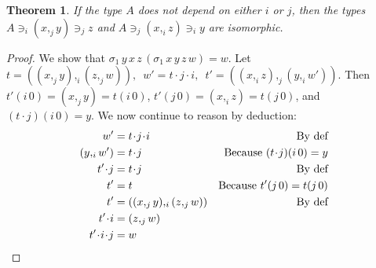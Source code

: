 \documentclass[english]{PaperTools/latex/entcs}
\theoremstyle{plain}
\newtheorem{theorem}{Theorem}
\theoremstyle{definition}
\theoremstyle{remark}
\newcommand\CP[3]{(#2,_{#1} #3)}
\newcommand\param[1]{\!\cdot\!#1}
\newcommand\op[1]{∋_{#1}}
\newcommand\mor[2]{({#1}\,{#2})}
\newcommand\proj[2]{{#2}\mor{#1}0}
\newcommand\projp[2]{\proj{#1}{(#2)}}
\def\ie{\textit{i.e.}}
\begin{document}
\begin{theorem}
  If the type $A$ does not depend on either $i$ or $j$, then
  the types $A \op i \CP j x y \op j z$ and $A \op j \CP i x z \op i y$ are isomorphic.
\end{theorem}
\begin{proof}
  We show that %
  $\sigma_1\, y\, x\, z\, (\sigma_1\, x\, y\, z\, w) = w$.
  Let
    $t = \CP i {\CP j x y}{\CP j z w},\enspace
    w' = t \param j \param i,\enspace
    t' = \CP j {\CP i x z}{\CP i y {w'}}.$
  Then
  $\proj i {t'} = \CP j x y = \proj i t$,
  $\proj j {t'} = \CP i x z = \proj j t$, and
  $\projp i {t\param j} = y$.
We now continue to reason by deduction:
  \begin{align*}
    w' &= t \param j \param i & \text{By def}\\
    {\CP i y {w'}} &= t\param j & \text{Because $\projp i {t\param j} = y $}  \\
    t'\param j &= t\param j & \text{By def}\\
    t' &= t &\text{Because $\proj j {t'} = \proj j t$} \\
    t' &= \CP i {\CP j x y} {\CP j z w} & \text{By def} \\
    t'\param i &= \CP j z w \\
    t'\param i\param j &= w
  \qedhere
  \end{align*}
\end{proof}
\end{document}
